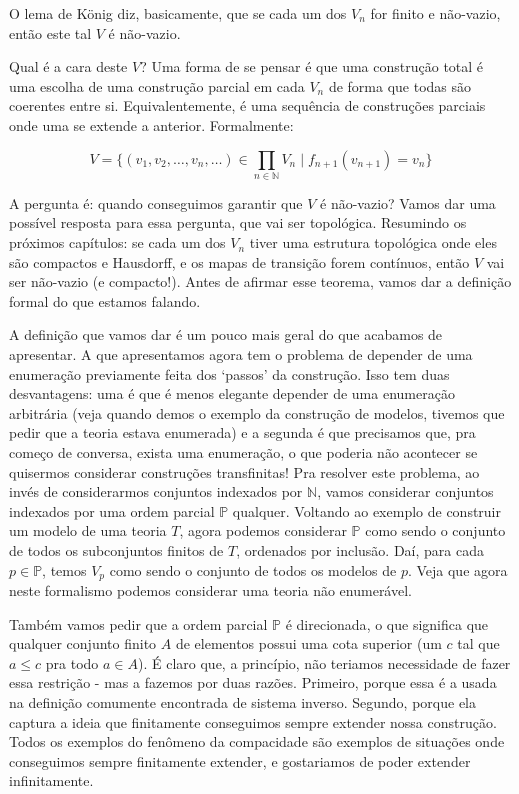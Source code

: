 \documentclass[11pt]{article}
\renewcommand{\textbf}[1]{{\fakebold#1}}
\theoremstyle{definition}
\theoremstyle{definition}
\theoremstyle{definition}
\theoremstyle{definition}
\theoremstyle{definition}
\theoremstyle{definition}
\theoremstyle{definition}
\theoremstyle{definition}
\theoremstyle{definition}
\theoremstyle{definition}
\theoremstyle{definition}
\theoremstyle{definition}
\theoremstyle{definition}
\begin{document}
O lema de König diz, basicamente, que se cada um dos $V_n$ for finito e não-vazio, então este tal $V$ é não-vazio.

Qual é a cara deste $V$? Uma forma de se pensar é que uma construção total é uma escolha de uma construção parcial em cada $V_n$ de forma que todas são coerentes entre si. Equivalentemente, é uma sequência de construções parciais onde uma se extende a anterior. Formalmente:

\[V = \{ (v_1, v_2, \dots, v_n, \dots) \in \prod_{n \in \mathbb{N}} V_n \mid f_{n+1}(v_{n+1}) = v_n \} \]

A pergunta é: quando conseguimos garantir que $V$ é não-vazio? Vamos dar uma possível resposta para essa pergunta, que vai ser topológica. Resumindo os próximos capítulos: se cada um dos $V_n$ tiver uma estrutura topológica onde eles são compactos e Hausdorff, e os mapas de transição forem contínuos, então $V$ vai ser não-vazio (e compacto!). Antes de afirmar esse teorema, vamos dar a definição formal do que estamos falando. 

A definição que vamos dar é um pouco mais geral do que acabamos de apresentar. A que apresentamos agora tem o problema de depender de uma enumeração previamente feita dos `passos' da construção. Isso tem duas desvantagens: uma é que é menos elegante depender de uma enumeração arbitrária (veja quando demos o exemplo da construção de modelos, tivemos que pedir que a teoria estava enumerada) e a segunda é que precisamos que, pra começo de conversa, exista uma enumeração, o que poderia não acontecer se quisermos considerar construções transfinitas! Pra resolver este problema, ao invés de considerarmos conjuntos indexados por $\mathbb{N}$, vamos considerar conjuntos indexados por uma ordem parcial $\mathbb{P}$ qualquer. Voltando ao exemplo de construir um modelo de uma teoria $T$, agora podemos considerar $\mathbb{P}$ como sendo o conjunto de todos os subconjuntos finitos de $T$, ordenados por inclusão. Daí, para cada $p \in \mathbb{P}$, temos $V_p$ como sendo o conjunto de todos os modelos de $p$. Veja que agora neste formalismo podemos considerar uma teoria não enumerável.

Também vamos pedir que a ordem parcial $\mathbb{P}$ é \textbf{direcionada}, o que significa que qualquer conjunto finito $A$ de elementos possui uma cota superior (um $c$ tal que $a\leq c$ pra todo $a \in A$). É claro que, a princípio, não teriamos necessidade de fazer essa restrição - mas a fazemos por duas razões. Primeiro, porque essa é a usada na definição comumente encontrada de sistema inverso. Segundo, porque ela captura a ideia que finitamente conseguimos sempre extender nossa construção. Todos os exemplos do fenômeno da compacidade são exemplos de situações onde conseguimos sempre finitamente extender, e gostariamos de poder extender infinitamente.
\end{document}
